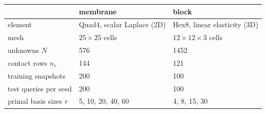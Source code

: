 \begin{tabular}{lll}
\hline
 & membrane & block \\
\hline
element & Quad4, scalar Laplace (2D) & Hex8, linear elasticity (3D) \\
mesh & $25\times25$ cells & $12\times12\times3$ cells \\
unknowns $N$ & 576 & 1452 \\
contact rows $n_c$ & 144 & 121 \\
training snapshots & 200 & 100 \\
test queries per seed & 200 & 100 \\
primal basis sizes $r$ & 5, 10, 20, 40, 60 & 4, 8, 15, 30 \\
\hline
\end{tabular}
